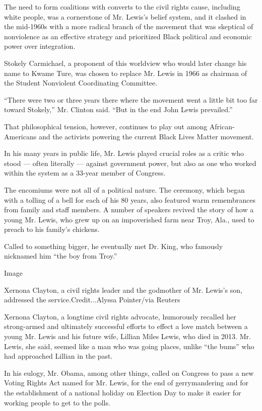 The need to form coalitions with converts to the civil rights cause,
including white people, was a cornerstone of Mr. Lewis's belief system,
and it clashed in the mid-1960s with a more radical branch of the
movement that was skeptical of nonviolence as an effective strategy and
prioritized Black political and economic power over integration.

Stokely Carmichael, a proponent of this worldview who would later change
his name to Kwame Ture, was chosen to replace Mr. Lewis in 1966 as
chairman of the Student Nonviolent Coordinating Committee.

``There were two or three years there where the movement went a little
bit too far toward Stokely,'' Mr. Clinton said. ``But in the end John
Lewis prevailed.''

That philosophical tension, however, continues to play out among
African-Americans and the activists powering the current Black Lives
Matter movement.

In his many years in public life, Mr. Lewis played crucial roles as a
critic who stood --- often literally --- against government power, but
also as one who worked within the system as a 33-year member of
Congress.

The encomiums were not all of a political nature. The ceremony, which
began with a tolling of a bell for each of his 80 years, also featured
warm remembrances from family and staff members. A number of speakers
revived the story of how a young Mr. Lewis, who grew up on an
impoverished farm near Troy, Ala., used to preach to his family's
chickens.

Called to something bigger, he eventually met Dr. King, who famously
nicknamed him ``the boy from Troy.''

Image

Xernona Clayton, a civil rights leader and the godmother of Mr. Lewis's
son, addressed the service.Credit...Alyssa Pointer/via Reuters

Xernona Clayton, a longtime civil rights advocate, humorously recalled
her strong-armed and ultimately successful efforts to effect a love
match between a young Mr. Lewis and his future wife, Lillian Miles
Lewis, who died in 2013. Mr. Lewis, she said, seemed like a man who was
going places, unlike ``the bums'' who had approached Lillian in the
past.

In his eulogy, Mr. Obama, among other things, called on Congress to pass
a new Voting Rights Act named for Mr. Lewis, for the end of
gerrymandering and for the establishment of a national holiday on
Election Day to make it easier for working people to get to the polls.

